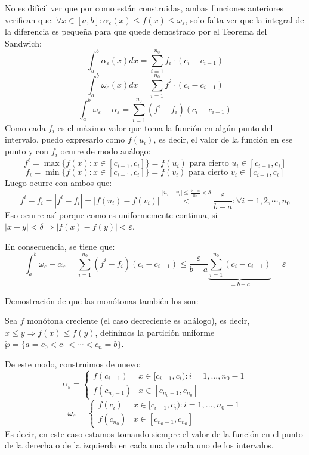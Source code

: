 \documentclass[10pt,a4paper,openright]{book}
\begin{document}
No es difícil ver que por como están construidas, ambas funciones anteriores verifican que: $\forall x\in[a,b]: \alpha_\varepsilon (x)\leq f(x)\leq \omega_\varepsilon$, solo falta ver que la integral de la diferencia es pequeña para que quede demostrado por el Teorema del Sandwich:
$$\int_{a}^{b}\alpha_\varepsilon(x) dx = \sum_{i = 1}^{n_0} f_i\cdot (c_i-c_{i-1})$$
$$\int_{a}^{b}\omega_\varepsilon(x) dx = \sum_{i = 1}^{n_0} f^i\cdot (c_i-c_{i-1})$$
$$\int_{a}^{b} \omega_\varepsilon - \alpha_\varepsilon = \sum_{i = 1}^{n_0} (f^i-f_i)(c_i-c_{i-1})$$
Como cada $f_i$ es el máximo valor que toma la función en algún punto del intervalo, puedo expresarlo como $f(u_i)$, es decir, el valor de la función en ese punto y con $f_i$ ocurre de modo análogo:
$$f^i = \max\{f(x): x\in [c_{i-1},c_{i}]\} =  f(u_i) \mbox{ para cierto } u_i\in [c_{i-1},c_{i}]$$
$$f_i = \min\{f(x): x\in [c_{i-1}, c_{i}]\} = f(v_i)\mbox{ para cierto } v_i\in [c_{i-1},c_{i}]$$
Luego ocurre con ambos que:
$$f^i-f_i = |f^i - f_i| = \left|f(u_i)- f(v_i)\right| \stackrel{|u_i-v_i|\leq \frac{b-a}{n_0}<\delta}{<} \frac{\varepsilon}{b-a}: \forall i = 1, 2,\cdots , n_0 $$
Eso ocurre así porque como es uniformemente continua, si $|x-y|<\delta\Rightarrow |f(x)-f(y)|<\varepsilon$.

En consecuencia, se tiene que:
$$\int_{a}^{b} \omega_\varepsilon - \alpha_\varepsilon = \sum_{i = 1}^{n_0} (f^i-f_i)(c_i-c_{i-1}) \leq \frac{\varepsilon}{b-a}\underbrace{\sum_{ i = 1}^{n_0} (c_i-c_{i-1})}_{=b-a} = \varepsilon$$

Demostración de que las monótonas también los son:

Sea $f$ monótona creciente (el caso decreciente es análogo), es decir, $x\leq y\Rightarrow f(x)\leq f(y)$, definimos la partición uniforme $\mathring{\wp} =\{a = c_0 < c_1 < \cdots < c_n = b\}$.

De este modo, construimos de nuevo:
$$\alpha_\varepsilon = \begin{cases} f(c_{i-1}) & x\in [c_{i-1}, c_i): i=1,..., n_0-1 \\ f(c_{n_0-1}) & x\in [c_{n_0-1}, c_{n_0}]\end{cases}$$
$$\omega_\varepsilon = \begin{cases} f(c_{i}) & x\in [c_{i-1}, c_i): i=1,..., n_0-1 \\ f(c_{n_0}) & x\in [c_{n_0-1}, c_{n_0}]\end{cases}$$
Es decir, en este caso estamos tomando siempre el valor de la función en el punto de la derecha o de la izquierda en cada una de cada uno de los intervalos.
\end{document}
